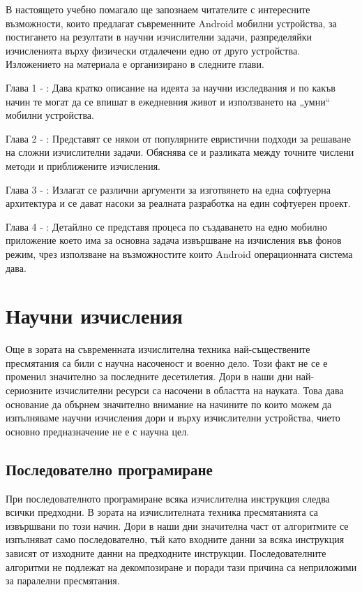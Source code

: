 \documentclass[book,14pt,oneside,openany]{memoir}
\begin{document}
В настоящето учебно помагало ще запознаем читателите с интересните възможности, които предлагат съвременните Android мобилни устройства, за постигането на резултати в научни изчислителни задачи, разпределяйки изчисленията върху физически отдалечени едно от друго устройства. Изложението на материала е организирано в следните глави. 

Глава 1 - : Дава кратко описание на идеята за научни изследвания и по какъв начин те могат да се впишат в ежедневния живот и използването на „умни“ мобилни устройства.

Глава 2 - : Представят се някои от популярните евристични подходи за решаване на сложни изчислителни задачи. Обяснява се и разликата между точните числени методи и приближените изчисления.  

Глава 3 - : Излагат се различни аргументи за изготвянето на една софтуерна архитектура и се дават насоки за реалната разработка на един софтуерен проект. 

Глава 4 - : Детайлно се представя процеса по създаването на едно мобилно приложение което има за основна задача извършване на изчисления във фонов режим, чрез използване на възможностите които Android операционната система дава. 

\newpage
\chapter{Научни изчисления}
\label{chapter01}

Още в зората на съвременната изчислителна техника най-съществените пресмятания са били с научна насоченост и военно дело. Този факт не се е променил значително за последните десетилетия. Дори в наши дни най-сериозните изчислителни ресурси са насочени в областта на науката. Това дава основание да обърнем значително внимание на начините по които можем да изпълняваме научни изчисления дори и върху изчислителни устройства, чието основно предназначение не е с научна цел. 

\section{Последователно програмиране}

При последователното програмиране всяка изчислителна инструкция следва всички предходни. В зората на изчислителната техника пресмятанията са извършвани по този начин. Дори в наши дни значителна част от алгоритмите се изпълняват само последователно, тъй като входните данни за всяка инструкция зависят от изходните данни на предходните инструкции. Последователните алгоритми не подлежат на декомпозиране и поради тази причина са неприложими за паралелни пресмятания. 
\end{document}
